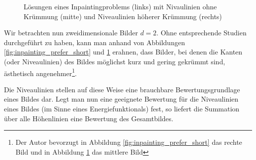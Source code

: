 \documentclass{mythesis}
\begin{document}
\begin{figure}[ht]
    \begin{subfigure}[b]{0.33\textwidth}
	\centering
    \end{subfigure}%
    \begin{subfigure}[b]{0.33\textwidth}
	\centering
    \end{subfigure}%
    \begin{subfigure}[b]{0.33\textwidth}
	\centering
    \end{subfigure}
    \caption{Lösungen eines Inpaintingproblems (links) mit Nivaulinien ohne Krümmung (mitte) und Niveaulinien höherer Krümmung (rechts)}
    \label{fig:inpainting_prefer_non_curved}
\end{figure}

Wir betrachten nun zweidimensionale Bilder $d = 2$.
Ohne entsprechende Studien durchgeführt zu haben, kann man anhand von Abbildungen \ref{fig:inpainting_prefer_short} und \ref{fig:inpainting_prefer_non_curved} erahnen, dass Bilder, bei denen die Kanten (oder Niveaulinien) des Bildes möglichst kurz und gering gekrümmt sind, ästhetisch angenehmer\footnote{Der Autor bevorzugt in Abbildung \ref{fig:inpainting_prefer_short} das rechte Bild und in Abbildung \ref{fig:inpainting_prefer_non_curved} das mittlere Bild}.

Die Niveaulinien stellen auf diese Weise eine brauchbare Bewertungsgrundlage eines Bildes dar.
Legt man nun eine geeignete Bewertung für die Niveaulinien eines Bildes (im Sinne eines Energiefunktionals) fest, so liefert die Summation über alle Höhenlinien eine Bewertung des Gesamtbildes.
\end{document}
